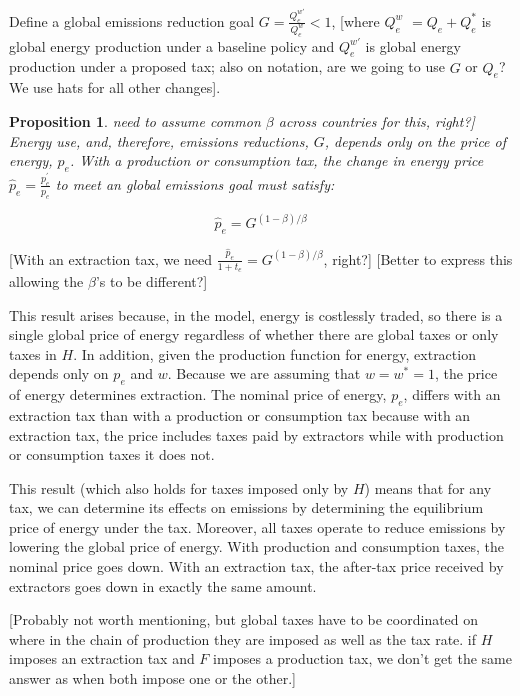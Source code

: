 \documentclass[notitlepage,12pt]{article}
\newtheorem{proposition}[theorem]{Proposition}
\begin{document}
Define a global emissions reduction goal $G=\frac{Q_{e}^{w\prime }}{Q_{e}^{w}%
}<1$, [where $Q_{e}^{w}$ $=Q_{e}+Q_{e}^{\ast }$ is global energy production
under a baseline policy and $Q_{e}^{w\prime }$ is global energy production
under a proposed tax; also on notation, are we going to use $G$ or $\hat{Q}%
_{e}$? We use hats for all other changes].

\begin{proposition}
\lbrack need to assume common $\beta $ across countries for this, right?]
Energy use, and, therefore, emissions reductions, $G$, depends only on the
price of energy, $p_{e}$. With a production or consumption tax, the change
in energy price $\hat{p}_{e}=\frac{p_{e}^{\prime }}{p_{e}}$ to meet an
global emissions goal must satisfy:
\end{proposition}

\begin{equation*}
\hat{p}_{e}=G^{\left( 1-\beta \right) /\beta }
\end{equation*}

[With an extraction tax, we need $\frac{\hat{p}_{e}}{1+t_{e}}=G^{\left(
1-\beta \right) /\beta }$, right?] [Better to express this allowing the $%
\beta $'s to be different?]

This result arises because, in the model, energy is costlessly traded, so
there is a single global price of energy regardless of whether there are
global taxes or only taxes in $H$. In addition, given the production
function for energy, extraction depends only on $p_{e}$ and $w$. Because we
are assuming that $w=w^{\ast }=1$, the price of energy determines
extraction. The nominal price of energy, $p_{e}$, differs with an extraction
tax than with a production or consumption tax because with an extraction
tax, the price includes taxes paid by extractors while with production or
consumption taxes it does not.

This result (which also holds for taxes imposed only by $H$) means that for
any tax, we can determine its effects on emissions by determining the
equilibrium price of energy under the tax. Moreover, all taxes operate to
reduce emissions by lowering the global price of energy. With production and
consumption taxes, the nominal price goes down. With an extraction tax, the
after-tax price received by extractors goes down in exactly the same amount.

[Probably not worth mentioning, but global taxes have to be coordinated on
where in the chain of production they are imposed as well as the tax rate.
if $H$ imposes an extraction tax and $F$ imposes a production tax, we don't
get the same answer as when both impose one or the other.]
\end{document}
